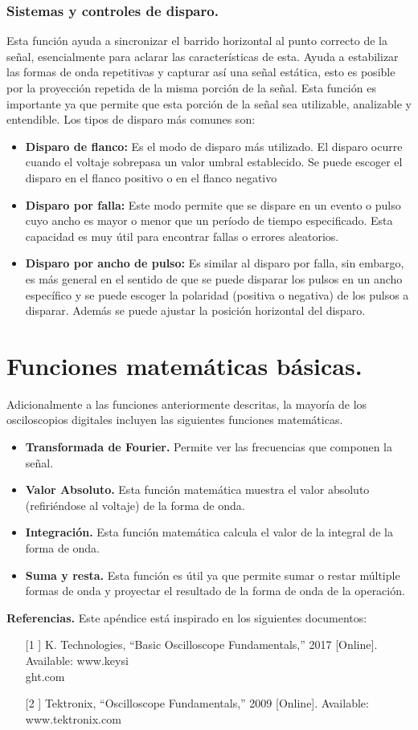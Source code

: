 \documentclass[12pt,letterpaper]{report}
\begin{document}
\subsubsection{Sistemas y controles de disparo.} Esta función ayuda a sincronizar el barrido horizontal al punto correcto de la señal, esencialmente para aclarar las características de esta. Ayuda a estabilizar las formas de onda repetitivas y capturar así una señal estática, esto es posible por la proyección repetida de la misma porción de la señal. Esta función es importante ya que permite que esta porción de la señal sea utilizable, analizable y entendible. Los tipos de disparo más comunes son:
\begin{itemize}
\item \textbf{Disparo de flanco:} Es el modo de disparo más utilizado. El disparo ocurre cuando el voltaje sobrepasa un valor umbral establecido. Se puede escoger el disparo en el flanco positivo o en el flanco negativo
\item \textbf{Disparo por falla:} Este modo permite que se dispare en un evento o pulso cuyo ancho es mayor o menor que un período de tiempo especificado. Esta capacidad es muy útil para encontrar fallas o errores aleatorios.
\item \textbf{Disparo por ancho de pulso:} Es similar al disparo por falla, sin embargo, es más general en el sentido de que se puede disparar los pulsos en un ancho específico y se puede escoger la polaridad (positiva o negativa) de los pulsos a disparar. Además se puede ajustar la posición horizontal del disparo.
\end{itemize}
\section{Funciones matemáticas básicas.} Adicionalmente a las funciones anteriormente descritas, la mayoría de los osciloscopios digitales incluyen las siguientes funciones matemáticas.
\begin{itemize}
\item \textbf{Transformada de Fourier.} Permite ver las frecuencias que componen la señal.
\item \textbf{Valor Absoluto.} Esta función matemática muestra el valor absoluto (refiriéndose al voltaje) de la forma de onda.
\item \textbf{Integración.} Esta función matemática calcula el valor de la integral de la forma de onda.
\item \textbf{Suma y resta.} Esta función es útil ya que permite sumar o restar múltiple formas de onda y proyectar el resultado de la forma de onda de la operación. 
\end{itemize}
\textbf{Referencias.} Este apéndice está inspirado en los siguientes documentos:
\begin{itemize}
    \item[[1]] K. Technologies, “Basic Oscilloscope Fundamentals,” 2017 [Online]. Available: www.keysi\\ght.com 
    \item[[2]] Tektronix, “Oscilloscope Fundamentals,” 2009 [Online]. Available: www.tektronix.com
\end{itemize}
\end{document}
